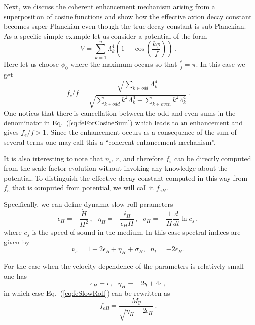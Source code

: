 \documentclass[11pt]{article}
\begin{document}
Next, we discuss the coherent enhancement mechanism arising from a superposition of cosine functions and show how the effective axion decay constant becomes super-Planckian even though the true decay constant is sub-Planckian.
As a specific simple example let us consider a potential of the form
\begin{equation} \label{eq:cosineSumPotential}
  V = \sum_{k = 1}^n \Lambda_k^4 \left(1 - \cos\left(\frac{k\phi}{f}\right)\right)\,.
\end{equation}
Here let us choose $\phi_0$ where the maximum occurs so that $\frac{\phi}{f} = \pi$.
In this case we get
\begin{equation} \label{eq:feForCosineSum}
  {f_e} / f = \frac
    {\sqrt{\sum_{k \in odd} \Lambda_k^4}}
    {\sqrt{\sum_{k \in odd} k^2 \Lambda_k^4 - \sum_{k \in even} k^2 \Lambda_k^4}}\,.
\end{equation}
One notices that there is cancellation between the odd and even sums in the denominator in Eq.~(\ref{eq:feForCosineSum}) which leads to an enhancement and gives $f_e / f > 1$.
Since the enhancement occurs as a consequence of the sum of several terms one may call this a ``coherent enhancement mechanism''.

It is also interesting to note that $n_s$, $r$, and therefore $f_e$ can be directly computed from the scale factor evolution without invoking any knowledge about the potential.
To distinguish the effective decay constant computed in this way from $f_e$ that is computed from potential, we will call it $f_{eH}$.

Specifically, we can define dynamic slow-roll parameters
\begin{equation} \label{eq:slowRollParametersDynamic}
  \epsilon_H = -\frac{\dot H}{H^2}\,,
  ~~~ \eta_H = -\frac{\dot{\epsilon_H}}{\epsilon_H H}\,,
  ~~~ \sigma_H = -\frac{1}{H} \frac{d}{dt} \ln c_s\,,
\end{equation}
where $c_s$ is the speed of sound in the medium.
In this case spectral indices are given by~\cite{Garriga:1999vw, Spalinski:2007qy}
\begin{equation}
      n_s = 1 - 2 \epsilon_H + \eta_H + \sigma_H,
  ~~~ n_t = - 2\epsilon_H\,.
\end{equation}

For the case when the velocity dependence of the parameters is relatively small one has
\begin{equation} \label{eq:slowRollParametersDynamicFromStatic}
  \epsilon_H = \epsilon\,,
  ~~~ \eta_H = -2 \eta + 4 \epsilon\,,
\end{equation}
in which case Eq.~(\ref{eq:feSlowRoll}) can be rewritten as
\begin{equation} \label{eq:feFromDynamicSlowRollParameters}
  f_{eH} = \frac{M_\text{P}}{\sqrt{\eta_H - 2 \epsilon_H}}\,.
\end{equation}
\end{document}
